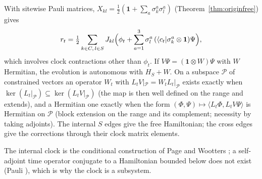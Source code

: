 \documentclass[aps,pra,onecolumn,superscriptaddress,nofootinbib,10pt]{revtex4-2}
\theoremstyle{definition}
\theoremstyle{remark}
\newcommand{\ip}[2]{\langle #1,#2\rangle}
\begin{document}
With sitewise Pauli matrices, $X_{kl}=\tfrac12(\mathbf1+\sum_a\sigma^a_k\sigma^a_l)$ (Theorem~\ref{thm:originfree}) gives
\begin{equation}\label{eq:cuexsource}
r_t=\tfrac12\sum_{k\in C,\,l\in S}J_{kl}\Bigl(\phi_t+\sum_{a=1}^3\sigma^a_l\,(\langle c_t\rvert\sigma^a_k\otimes\mathbf1)\Psi\Bigr),
\end{equation}
which involves clock contractions other than $\phi_t$.  If $V\Psi=(\mathbf1\otimes W)\Psi$ with $W$ Hermitian, the evolution is
autonomous with $H_S+W$.  On a subspace $\mathcal P$ of constrained vectors an operator $W_t$ with $L_tV|_{\mathcal P}=W_tL_t|_{\mathcal P}$ exists
exactly when $\ker(L_t|_{\mathcal P})\subseteq\ker(L_tV|_{\mathcal P})$ (the map is then well defined on the range and extends), and a
Hermitian one exactly when the form $(\Phi,\Psi)\mapsto\ip{L_t\Phi}{L_tV\Psi}$ is Hermitian on $\mathcal P$ (block extension on the range and
its complement; necessity by taking adjoints).  The internal $S$ edges give the free Hamiltonian; the cross
edges give the corrections through their clock matrix elements.

\noindent The internal clock is the conditional construction of Page and Wootters \cite{n1-pw}; a self-adjoint time operator
conjugate to a Hamiltonian bounded below does not exist (Pauli \cite{rf:Pauli1933}), which is why the clock is a subsystem.
\end{document}
